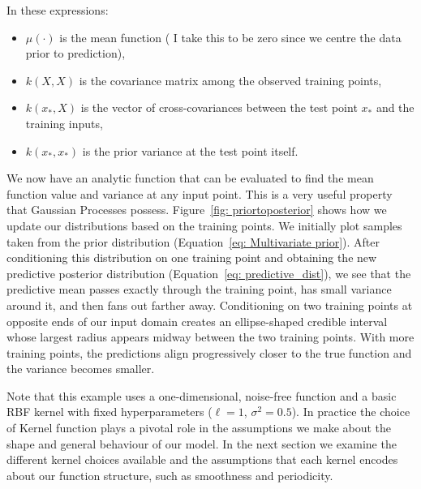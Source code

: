 \documentclass{article}
\begin{document}
In these expressions:
\begin{itemize}
    \item \( \mu(\cdot) \) is the mean function ( I take this to be zero since we centre the data prior to prediction),
    \item \( k(X, X) \) is the covariance matrix among the observed training points,
    \item \( k(x_*, X) \) is the vector of cross-covariances between the test point \(x_*\) and the training inputs,
    \item \( k(x_*, x_*) \) is the prior variance at the test point itself.
\end{itemize}

\noindent
We now have an analytic function that can be evaluated to find the mean function value and variance at any input point.
This is a very useful property that Gaussian Processes possess. Figure~\ref{fig: priortoposterior} shows how we update our
distributions based on the training points. We initially plot samples taken from the prior distribution (Equation~\ref{eq: Multivariate prior}). 
After conditioning this distribution on one training point and obtaining the new predictive posterior distribution (Equation~\ref{eq: predictive_dist}), 
we see that the predictive mean passes exactly through the training point, has small variance around it, and then fans out farther away. 
Conditioning on two training points at opposite ends of our input domain creates an ellipse-shaped credible interval whose largest radius 
appears midway between the two training points. With more training points, the predictions align progressively closer to the true function 
and the variance becomes smaller.

\noindent
Note that this example uses a one-dimensional, noise-free function and a basic RBF kernel with fixed hyperparameters (\(\ell = 1\), \(\sigma^2 = 0.5\)). 
In practice the choice of Kernel function plays a pivotal role in the assumptions we make about the shape and general behaviour of our model. In the next section
we examine the different kernel choices available and the assumptions that each kernel encodes about our function structure, such as smoothness and periodicity.
\end{document}
